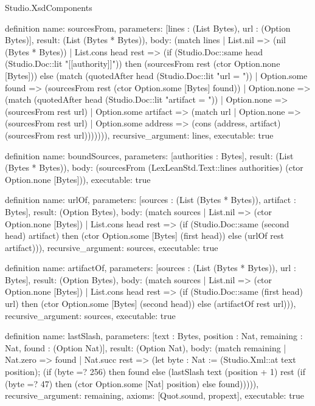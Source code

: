 \begin{lexlean}{Studio.XsdComponents}
\begin{semanticmodule}
definition{
  name: sourcesFrom,
  parameters: [lines : (List Bytes), url : (Option Bytes)],
  result: (List (Bytes * Bytes)),
  body: (match lines
    | List.nil => (nil (Bytes * Bytes))
    | List.cons head rest => (if (Studio.Doc::same head (Studio.Doc::lit "[[authority]]")) then (sourcesFrom rest (ctor Option.none [Bytes])) else (match (quotedAfter head (Studio.Doc::lit "url = "))
      | Option.some found => (sourcesFrom rest (ctor Option.some [Bytes] found))
      | Option.none => (match (quotedAfter head (Studio.Doc::lit "artifact = "))
        | Option.none => (sourcesFrom rest url)
        | Option.some artifact => (match url
          | Option.none => (sourcesFrom rest url)
          | Option.some address => (cons (address, artifact) (sourcesFrom rest url))))))),
  recursive_argument: lines,
  executable: true
}

definition{
  name: boundSources,
  parameters: [authorities : Bytes],
  result: (List (Bytes * Bytes)),
  body: (sourcesFrom (LexLeanStd.Text::lines authorities) (ctor Option.none [Bytes])),
  executable: true
}

definition{
  name: urlOf,
  parameters: [sources : (List (Bytes * Bytes)), artifact : Bytes],
  result: (Option Bytes),
  body: (match sources
    | List.nil => (ctor Option.none [Bytes])
    | List.cons head rest => (if (Studio.Doc::same (second head) artifact) then (ctor Option.some [Bytes] (first head)) else (urlOf rest artifact))),
  recursive_argument: sources,
  executable: true
}

definition{
  name: artifactOf,
  parameters: [sources : (List (Bytes * Bytes)), url : Bytes],
  result: (Option Bytes),
  body: (match sources
    | List.nil => (ctor Option.none [Bytes])
    | List.cons head rest => (if (Studio.Doc::same (first head) url) then (ctor Option.some [Bytes] (second head)) else (artifactOf rest url))),
  recursive_argument: sources,
  executable: true
}

definition{
  name: lastSlash,
  parameters: [text : Bytes, position : Nat, remaining : Nat, found : (Option Nat)],
  result: (Option Nat),
  body: (match remaining
    | Nat.zero => found
    | Nat.succ rest => (let byte : Nat := (Studio.Xml::at text position); (if (byte =? 256) then found else (lastSlash text (position + 1) rest (if (byte =? 47) then (ctor Option.some [Nat] position) else found))))),
  recursive_argument: remaining,
  axioms: [Quot.sound, propext],
  executable: true
}


\end{semanticmodule}
\end{lexlean}

